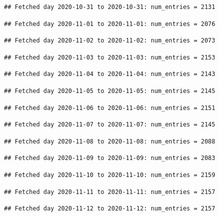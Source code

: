 \documentclass[]{article}
\begin{document}
\begin{verbatim}
## Fetched day 2020-10-31 to 2020-10-31: num_entries = 2131
\end{verbatim}

\begin{verbatim}
## Fetched day 2020-11-01 to 2020-11-01: num_entries = 2076
\end{verbatim}

\begin{verbatim}
## Fetched day 2020-11-02 to 2020-11-02: num_entries = 2073
\end{verbatim}

\begin{verbatim}
## Fetched day 2020-11-03 to 2020-11-03: num_entries = 2153
\end{verbatim}

\begin{verbatim}
## Fetched day 2020-11-04 to 2020-11-04: num_entries = 2143
\end{verbatim}

\begin{verbatim}
## Fetched day 2020-11-05 to 2020-11-05: num_entries = 2145
\end{verbatim}

\begin{verbatim}
## Fetched day 2020-11-06 to 2020-11-06: num_entries = 2151
\end{verbatim}

\begin{verbatim}
## Fetched day 2020-11-07 to 2020-11-07: num_entries = 2145
\end{verbatim}

\begin{verbatim}
## Fetched day 2020-11-08 to 2020-11-08: num_entries = 2088
\end{verbatim}

\begin{verbatim}
## Fetched day 2020-11-09 to 2020-11-09: num_entries = 2083
\end{verbatim}

\begin{verbatim}
## Fetched day 2020-11-10 to 2020-11-10: num_entries = 2159
\end{verbatim}

\begin{verbatim}
## Fetched day 2020-11-11 to 2020-11-11: num_entries = 2157
\end{verbatim}

\begin{verbatim}
## Fetched day 2020-11-12 to 2020-11-12: num_entries = 2157
\end{verbatim}
\end{document}

